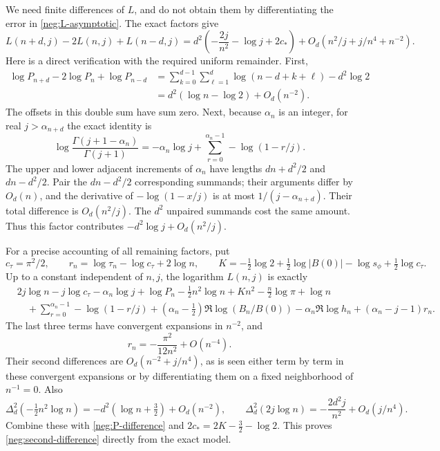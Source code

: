 \documentclass[11pt]{article}
\numberwithin{equation}{section}
\theoremstyle{definition}
\begin{document}
We need finite differences of \(L\), and do not obtain them
by differentiating the error in \eqref{neg:L-asymptotic}.
The exact factors give
\begin{equation}
 L(n+d,j)-2L(n,j)+L(n-d,j)
 =d^2\left(-\frac{2j}{n^2}-\log j+2c_*\right)
    +O_d(n^2/j+j/n^4+n^{-2}).
 \label{neg:second-difference}
\end{equation}
Here is a direct verification with the required uniform
remainder.  First,
\begin{align}
 \log P_{n+d}-2\log P_n+\log P_{n-d}
 &=\sum_{k=0}^{d-1}\sum_{\ell=1}^{d}
        \log(n-d+k+\ell)-d^2\log2\\
 &=d^2(\log n-\log2)+O_d(n^{-2}).
 \label{neg:P-difference}
\end{align}
The offsets in this double sum have sum zero.
Next, because \(\alpha_n\) is an integer, for real
\(j>\alpha_{n+d}\) the exact identity is
\[
 \log\frac{\Gamma(j+1-\alpha_n)}{\Gamma(j+1)}
 =-\alpha_n\log j+
      \sum_{r=0}^{\alpha_n-1}-\log(1-r/j).
 \]
The upper and lower adjacent increments of \(\alpha_n\)
have lengths \(dn+d^2/2\) and \(dn-d^2/2\).
Pair the \(dn-d^2/2\) corresponding summands; their
arguments differ by \(O_d(n)\), and the derivative of
\(-\log(1-x/j)\) is at most
\(1/(j-\alpha_{n+d})\).
Their total difference is \(O_d(n^2/j)\).
The \(d^2\) unpaired summands cost the same amount.
Thus this factor contributes
\(-d^2\log j+O_d(n^2/j)\).

For a precise accounting of all remaining factors, put
\[
 c_\tau=\pi^2/2,\qquad
 r_n=\log\tau_n-\log c_\tau+2\log n,\qquad
 K=-\tfrac12\log2+\tfrac12\log|B(0)|
                      -\log s_\phi+\tfrac12\log c_\tau .
 \]
Up to a constant independent of \(n,j\), the logarithm
\(L(n,j)\) is exactly
\begin{align*}
 &2j\log n-j\log c_\tau-\alpha_n\log j
   +\log P_n-\tfrac12n^2\log n+Kn^2
                 -\tfrac n2\log\pi+\log n\\
 &\quad+
 \sum_{r=0}^{\alpha_n-1}-\log(1-r/j)
 +(\alpha_n-\tfrac12)\Re\log(B_n/B(0))
 -\alpha_n\Re\log h_n+(\alpha_n-j-1)r_n .
\end{align*}
The last three terms have convergent expansions in \(n^{-2}\),
and
\[
 r_n=-\frac{\pi^2}{12n^2}+O(n^{-4}).
 \]
Their second differences are
\(O_d(n^{-2}+j/n^4)\), as is seen either term by term in
these convergent expansions or by differentiating them on
a fixed neighborhood of \(n^{-1}=0\).
Also
\[
 \Delta_d^2(-\tfrac12n^2\log n)
     =-d^2(\log n+\tfrac32)+O_d(n^{-2}),\qquad
 \Delta_d^2(2j\log n)
     =-\frac{2d^2j}{n^2}+O_d(j/n^4).
 \]
Combine these with \eqref{neg:P-difference} and
\(2c_*=2K-\tfrac32-\log2\).  This proves
\eqref{neg:second-difference} directly from the exact
model.
\end{document}
